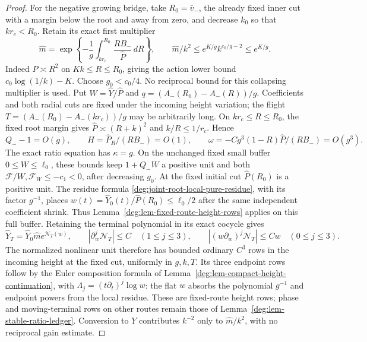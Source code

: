 \begin{proof}
For the negative growing bridge, take \(R_0=\bar v_-\), the
already fixed inner cut with a margin below the root and away from
zero, and decrease \(k_0\)
so that \(kr_c<R_0\). Retain its exact first multiplier
\[
 \widehat m=\exp\left\{-\frac1g\int_{kr_c}^{R_0}
       \frac{RB_-}{\widehat P}\,dR\right\},\qquad
 \widehat m/k^2\le e^{K/g}k^{c_0/g-2}\le e^{K/g}.
\]
Indeed \(\widehat P\asymp R^2\) on \(Kk\le R\le R_0\), giving
the action lower bound \(c_0\log(1/k)-K\). Choose \(g_0<c_0/4\).
No reciprocal bound for this collapsing multiplier is used.
Put \(W=\widehat Y/\widehat P\) and
\(q=(A_-(R_0)-A_-(R))/g\). Coefficients and both radial cuts are
fixed under the incoming height variation; the flight
\(T=(A_-(R_0)-A_-(kr_c))/g\) may be arbitrarily long.
On \(kr_c\le R\le R_0\), the fixed root margin gives
\(\widehat P\asymp(R+k)^2\) and \(k/R\le1/r_c\). Hence
\[
 Q_--1=O(g),\qquad
 H=\widehat P_R/(RB_-)=O(1),\qquad
 \omega=-Cg^3(1-R)\widehat P/(RB_-)=O(g^3).
\]
The exact ratio equation has \(\kappa=g\). On the unchanged fixed
small buffer \(0\le W\le\ell_0\), these bounds keep
\(1+Q_-W\) a positive unit and both
\(\mathcal F/W,\mathcal F_W\le-c_1<0\), after decreasing \(g_0\).
At the fixed initial cut \(\widehat P(R_0)\) is a positive unit.
The residue formula \eqref{deg:joint-root-local-pure-residue},
with its factor \(g^{-1}\), places
\(w(t)=\widehat Y_0(t)/\widehat P(R_0)\le\ell_0/2\)
after the same independent coefficient shrink. Thus
Lemma~\ref{deg:lem-fixed-route-height-rows} applies on this full buffer.
Retaining the terminal polynomial in its exact cocycle gives
\[
 \widehat Y_T=\widehat Y_0\widehat m
             e^{\mathcal N_T(w)},\qquad
 |\partial_w^j\mathcal N_T|\le C\quad(1\le j\le3),\qquad
 |(w\partial_w)^j\mathcal N_T|\le Cw\quad(0\le j\le3).
\]
The normalized nonlinear unit therefore has bounded ordinary \(C^3\)
rows in the incoming height at the fixed cut, uniformly in \(g,k,T\).
Its three endpoint rows follow by the Euler composition formula of
Lemma~\ref{deg:lem-compact-height-continuation}, with
\(\Lambda_j=(t\partial_t)^j\log w\): the flat \(w\) absorbs the
polynomial \(g^{-1}\) and endpoint powers from the local residue.
These are fixed-route height rows; phase and moving-terminal rows on
other routes remain those of Lemma~\ref{deg:lem-stable-ratio-ledger}.
Conversion to \(Y\) contributes \(k^{-2}\) only to
\(\widehat m/k^2\), with no reciprocal gain estimate.


\end{proof}
